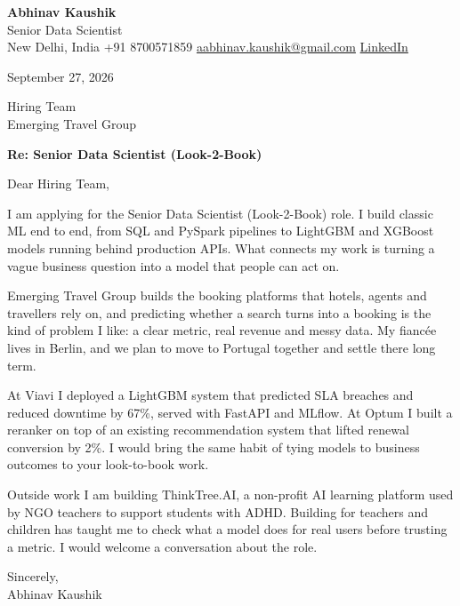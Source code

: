 \documentclass[11pt,a4paper]{article}
\begin{document}
{\Large\bfseries Abhinav Kaushik}\\
Senior Data Scientist\\
New Delhi, India \textbar{} +91 8700571859 \textbar{} \href{mailto:aabhinav.kaushik@gmail.com}{aabhinav.kaushik@gmail.com} \textbar{} \href{https://www.linkedin.com/in/abhinav-kaushik10/}{LinkedIn}  

September 27, 2026

Hiring Team\\
Emerging Travel Group

\textbf{Re: Senior Data Scientist (Look-2-Book)}

Dear Hiring Team,

I am applying for the Senior Data Scientist (Look-2-Book) role. I build classic ML end to end, from SQL and PySpark pipelines to LightGBM and XGBoost models running behind production APIs. What connects my work is turning a vague business question into a model that people can act on.

Emerging Travel Group builds the booking platforms that hotels, agents and travellers rely on, and predicting whether a search turns into a booking is the kind of problem I like: a clear metric, real revenue and messy data. My fiancée lives in Berlin, and we plan to move to Portugal together and settle there long term.

At Viavi I deployed a LightGBM system that predicted SLA breaches and reduced downtime by 67\%, served with FastAPI and MLflow. At Optum I built a reranker on top of an existing recommendation system that lifted renewal conversion by 2\%. I would bring the same habit of tying models to business outcomes to your look-to-book work.

Outside work I am building ThinkTree.AI, a non-profit AI learning platform used by NGO teachers to support students with ADHD. Building for teachers and children has taught me to check what a model does for real users before trusting a metric. I would welcome a conversation about the role.

Sincerely,\\[4pt]
Abhinav Kaushik
\end{document}

